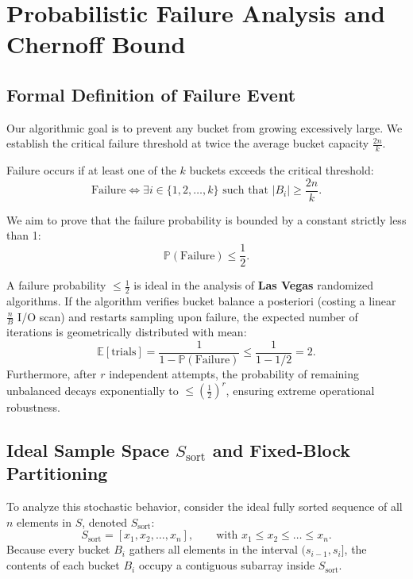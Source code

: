 \FloatBarrier
\section{Probabilistic Failure Analysis and Chernoff Bound}
\label{sec:failure-analysis-chernoff}

\subsection{Formal Definition of Failure Event}
Our algorithmic goal is to prevent any bucket from growing excessively large. We establish the critical failure threshold at twice the average bucket capacity $\frac{2n}{k}$.

\begin{definition}
Failure occurs if at least one of the $k$ buckets exceeds the critical threshold:
\begin{equation}
  \text{Failure} \iff \exists i \in \{1, 2, \dots, k\} \text{ such that } |B_i| \ge \frac{2n}{k}.
  \label{eq:failure-definition}
\end{equation}
\end{definition}

We aim to prove that the failure probability is bounded by a constant strictly less than 1:
\begin{equation}
  \mathbb{P}(\text{Failure}) \le \frac{1}{2}.
\end{equation}

\begin{property}
A failure probability $\le \frac{1}{2}$ is ideal in the analysis of \textbf{Las Vegas} randomized algorithms.
If the algorithm verifies bucket balance a posteriori (costing a linear $\frac{n}{B}$ I/O scan) and restarts sampling upon failure, the expected number of iterations is geometrically distributed with mean:
\begin{equation}
  \mathbb{E}[\text{trials}] = \frac{1}{1 - \mathbb{P}(\text{Failure})} \le \frac{1}{1 - 1/2} = 2.
\end{equation}
Furthermore, after $r$ independent attempts, the probability of remaining unbalanced decays exponentially to $\le \left(\frac{1}{2}\right)^r$, ensuring extreme operational robustness.
\end{property}

\subsection{Ideal Sample Space \texorpdfstring{$S_{\text{sort}}$}{S\_sort} and Fixed-Block Partitioning}
To analyze this stochastic behavior, consider the ideal fully sorted sequence of all $n$ elements in $S$, denoted $S_{\text{sort}}$:
\begin{equation}
  S_{\text{sort}} = [x_1, x_2, \dots, x_n], \qquad \text{with } x_1 \le x_2 \le \dots \le x_n.
\end{equation}
Because every bucket $B_i$ gathers all elements in the interval $(s_{i-1}, s_i]$, the contents of each bucket $B_i$ occupy a contiguous subarray inside $S_{\text{sort}}$.

